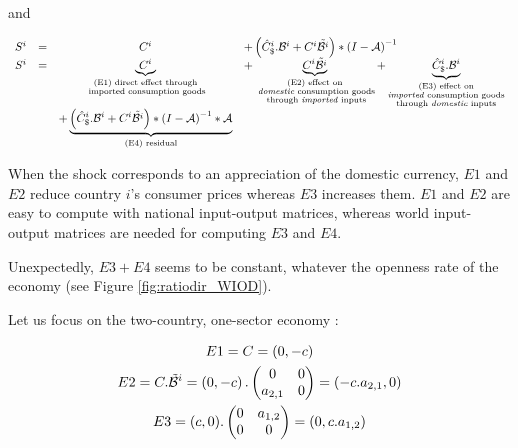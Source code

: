 \documentclass[11pt,a4paper]{article}
\begin{document}
and

\begin{equation}
\begin{array}{lccl}
S^ i&=&C^i	&+ \left(\hat{C}^i_\$.{\cal B}^i+{C^i}{\tilde{{\cal B}^i}}\right)*{{(I-{\cal A})}^{-1}} \\
S^i &=&\underbrace{C^i}_{\substack{\text{(E1) direct effect through} \\ \text{ imported consumption goods}}}&+ \underbrace{{C^i}{\tilde{{\cal B}^i}}}_{\substack{\text{(E2) effect on} \\ \text{ \emph{domestic} consumption goods} \\ \text{ through \emph{imported} inputs}}}  + \underbrace{\hat{C}^i_\$.{\cal B}^i}_{\substack{\text{(E3)  effect on} \\ \text{\emph{imported} consumption goods} \\ \text{through \emph{domestic} inputs}}} \\ &&+\underbrace {\left( \hat{C}^i_\$.{\cal B}^i + {C^i}{\tilde{{\cal B}^i}}\right)*{{(I-{\cal A})}^{-1}}*{\cal A}}_{\text{(E4) residual}} \\
\end{array}
\end{equation}



When the shock corresponds to an appreciation of the domestic currency, $E1$ and $E2$ reduce country $i$'s consumer prices whereas $E3$ increases them. $E1$ and $E2$ are easy to compute with national input-output matrices, whereas world input-output matrices are needed for computing $E3$ and $E4$.

Unexpectedly, $E3 + E4$ seems to be constant, whatever the openness rate of the economy (see Figure \ref{fig:ratiodir_WIOD}).


Let us focus on the two-country, one-sector economy : 

\begin{gather*}
E1=C=\left(0,-c\right)
\\
E2=C.\tilde{\cal B}^i=\left(0,-c\right).\left(\begin{matrix}0&0\\a_{2,1}&0\end{matrix}\right)=\left(-c.a_{2,1},0\right)
\\
E3=(c,0).\left(\begin{matrix}0&a_{1,2}\\0&0\end{matrix}\right)=\left(0,c.a_{1,2}\right)
\end{gather*}
\end{document}
